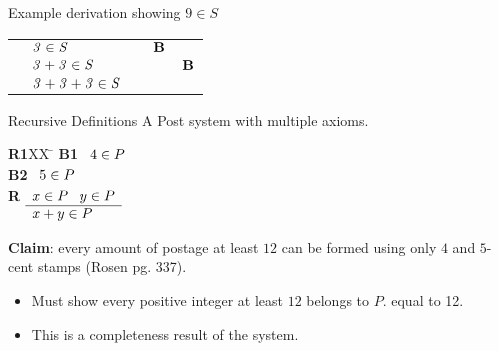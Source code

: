 \begin{wideslide}[bm=,toc=]{Example derivation showing $9 \in S$}
\vspace{20mm}
\begin{center}
\begin{tabular}{lllll}
  \onslide{2-}{$\bid{B}$  & $\id{3}\in \id{S}$}           & \onslide{3-}{$\id{3}\in \id{S}$ & $\bid{B}$}
  \onslide{4-}{\\ \cline{2-3}}
  \onslide{5-}{$\bid{R}$  & $\mbox{\it 3\/} + \mbox{\it 3\/} \in \mbox{\it S\/}$} &                    & \onslide{6-}{$\id{3}\in \id{S}$ & $\bid{B}$} 
  \onslide{7-}{\\ \cline{2-4}} 
  \onslide{8-}{$\bid{R}$  & $\mbox{\it 3\/} + \mbox{\it 3\/} + \mbox{\it 3\/} \in \mbox{\it S\/}$ &           & &  \\} 
\end{tabular}
\end{center}

\end{wideslide}
\begin{wideslide}[bm=,toc=]{Recursive Definitions}
A Post system with multiple axioms.
\begin{tabbing}
{\bf R1}XX \=  \kill
\pause
{\bf B1} \>
        \(\begin{array}[t]{l}
        4\in P
        \end{array}\) \\[2ex]
\pause
{\bf B2} \>
        \(\begin{array}[t]{l}
        5\in P
        \end{array}\) \\[2ex]
        
\pause
{\bf R} \>
        \(\begin{array}[t]{l}
        x \in P \;\;\;y \in P \\
        \hline
        x + y \in P
        \end{array}\)
\end{tabbing}
\pause
\textbf{Claim}: every amount of postage at least $12$ can be formed using only $4$
and $5$-cent stamps (Rosen pg. 337).
\begin{itemize}
\item<6-> Must show every positive integer at least $12$ belongs to $P$. 
equal to 12.
\item<7-> This is a completeness result of the system.
\end{itemize}
\end{wideslide}

